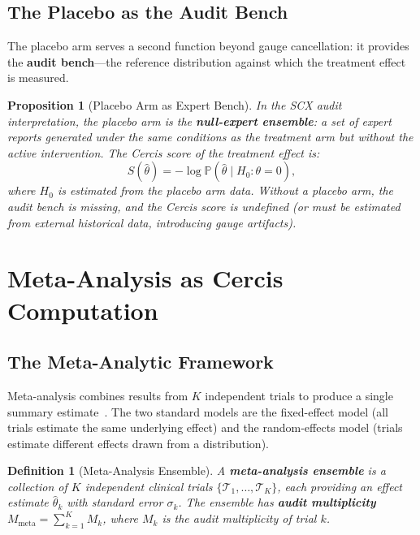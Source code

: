 \documentclass[12pt,a4paper]{article}
\newtheorem{proposition}[theorem]{Proposition}
\newtheorem{definition}[theorem]{Definition}
\theoremstyle{remark}
\newcommand{\Pbb}{\mathbb{P}}
\newcommand{\SCX}{\textsf{SCX}}
\newcommand{\Cercis}{\textsf{Cercis}}
\begin{document}
\subsection{The Placebo as the Audit Bench}

The placebo arm serves a second function beyond gauge cancellation: it
provides the \textbf{audit bench}---the reference distribution against
which the treatment effect is measured.

\begin{proposition}[Placebo Arm as Expert Bench]
\label{prop:placebo_bench}
In the \SCX{} audit interpretation, the placebo arm is the
\textbf{null-expert ensemble}: a set of expert reports generated under
the same conditions as the treatment arm but without the active
intervention. The \Cercis{} score of the treatment effect is:
\begin{equation}
  S(\hat{\theta}) = -\log \Pbb(\hat{\theta} \mid H_0: \theta = 0),
\end{equation}
where $H_0$ is estimated from the placebo arm data. Without a placebo
arm, the audit bench is missing, and the \Cercis{} score is undefined
(or must be estimated from external historical data, introducing
gauge artifacts).
\end{proposition}


\section{Meta-Analysis as Cercis Computation}
\label{sec:meta}

\subsection{The Meta-Analytic Framework}

Meta-analysis combines results from $K$ independent trials to produce a
single summary estimate~\cite{derSimonian1986meta, thompson1994presenting}.
The two standard models are the fixed-effect model (all trials estimate the
same underlying effect) and the random-effects model (trials estimate
different effects drawn from a distribution).

\begin{definition}[Meta-Analysis Ensemble]
\label{def:meta_ensemble}
A \textbf{meta-analysis ensemble} is a collection of $K$ independent
clinical trials $\{\mathcal{T}_1, \ldots, \mathcal{T}_K\}$, each
providing an effect estimate $\hat{\theta}_k$ with standard error
$\sigma_k$. The ensemble has \textbf{audit multiplicity}
$M_{\text{meta}} = \sum_{k=1}^K M_k$, where $M_k$ is the audit
multiplicity of trial $k$.
\end{definition}
\end{document}
